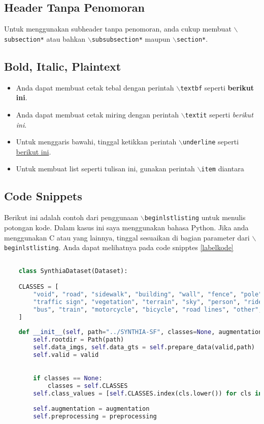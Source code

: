\documentclass[11pt,a4paper]{article}
\begin{document}
\subsection*{Header Tanpa Penomoran}
     Untuk menggunakan subheader tanpa penomoran, anda cukup membuat $\backslash${\tt{subsection*}} atau bahkan  $\backslash${\tt{subsubsection*}} maupun $\backslash${\tt{section*}}.
    
\subsection{Bold, Italic, Plaintext}
\begin{itemize}
    \item Anda dapat membuat cetak tebal dengan perintah $\backslash${\tt{textbf}} seperti \textbf{berikut ini}.
    \item Anda dapat membuat cetak miring dengan perintah $\backslash${\tt{textit}} seperti \textit{berikut ini}. \item Untuk menggaris bawahi, tinggal ketikkan perintah $\backslash${\tt{underline}} seperti \underline{berikut ini}.
    \item Untuk membuat list seperti tulisan ini, gunakan perintah $\backslash${\tt{item}} diantara
\end{itemize}

\subsection{Code Snippets}
    Berikut ini adalah contoh dari penggunaan $\backslash${\tt{begin{lstlisting}}} untuk menulis potongan kode. Dalam kasus ini saya menggunakan bahasa Python. Jika anda menggunakan C atau yang lainnya, tinggal sesuaikan di bagian parameter dari $\backslash${\tt{begin{lstlisting}}}. Anda dapat melihatnya pada code snipptes \ref{labelkode}
    
    \begin{lstlisting}[language=Python, caption=Captionnya tulis di sini class,label={labelkode}]
    
    class SynthiaDataset(Dataset):

    CLASSES = [
        "void", "road", "sidewalk", "building", "wall", "fence", "pole", "traffic light", 
        "traffic sign", "vegetation", "terrain", "sky", "person", "rider", "car", "truck", 
        "bus", "train", "motorcycle", "bicycle", "road lines", "other", "road works"
    ]
    
    def __init__(self, path="../SYNTHIA-SF", classes=None, augmentation=None, preprocessing=None, valid=False):
        self.rootdir = Path(path)
        self.data_imgs, self.data_gts = self.prepare_data(valid,path)
        self.valid = valid

    
        if classes == None:
            classes = self.CLASSES 
        self.class_values = [self.CLASSES.index(cls.lower()) for cls in classes]
        
        self.augmentation = augmentation
        self.preprocessing = preprocessing
    \end{lstlisting}
\end{document}
